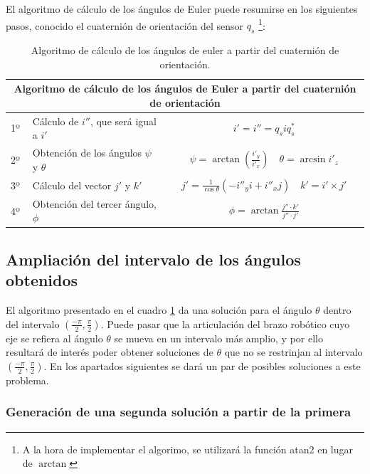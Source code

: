 \documentclass[10pt, a4paper]{report}
\begin{document}
El algoritmo de cálculo de los ángulos de Euler puede resumirse en los siguientes pasos, conocido el cuaternión de orientación del sensor $q_s$ \footnote{A la hora de implementar el algorimo, se utilizará la función atan2 en lugar de $\arctan$}:

\begin{table}[h]
	\center
	\begin{tabular}{|l|l|c|}
	\hline
	\multicolumn{3}{|c|}{\textbf{Algoritmo de cálculo de los ángulos de Euler a partir del cuaternión de orientación}}\\
	\hline
	1º & Cálculo de $i''$, que será igual a $i'$ & $ i' = i'' = q_siq_s^* $ \\
	2º & Obtención de los ángulos $\psi$ y $\theta$ & $ \psi = \arctan \left( \displaystyle\frac{i'_y}{i'_x} \right) \quad \theta = \arcsin i'_z $ \\
	3º & Cálculo del vector $j'$ y $k'$ & $ j' = \displaystyle\frac{1}{\cos\theta} \left( - i''_y i + i''_x j \right) \quad k' = i' \times j' $ \\
	4º & Obtención del tercer ángulo, $\phi$ & $ \phi = \arctan \displaystyle\frac{j'' \cdot k'}{j'' \cdot j'} $ \\
	\hline
	\end{tabular}

	\caption{Algoritmo de cálculo de los ángulos de euler a partir del cuaternión de orientación.}
	\label{tab:algoritmo_angulos_euler}

\end{table}

\subsection{Ampliación del intervalo de los ángulos obtenidos}

El algoritmo presentado en el cuadro \ref{tab:algoritmo_angulos_euler} da una solución para el ángulo $\theta$ dentro del intervalo $\left(\frac{-\pi}{2}, \frac{\pi}{2} \right)$. Puede pasar que la articulación del brazo robótico cuyo eje se refiera al ángulo $\theta$ se mueva en un intervalo más amplio, y por ello resultará de interés poder obtener soluciones de $\theta$ que no se restrinjan al intervalo $\left(\frac{-\pi}{2}, \frac{\pi}{2} \right)$. En los apartados siguientes se dará un par de posibles soluciones a este problema.

\subsubsection{Generación de una segunda solución a partir de la primera}
\end{document}

